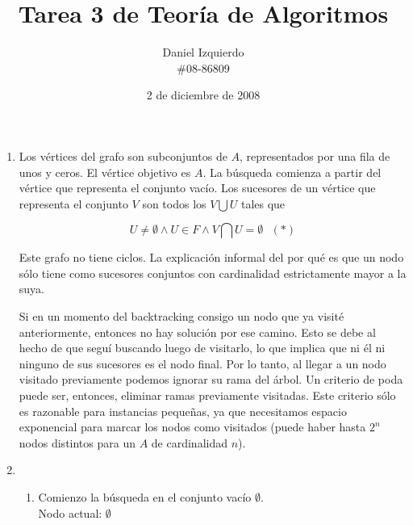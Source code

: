 \documentclass{article}
\begin{document}

\title{Tarea 3 de Teoría de Algoritmos}
\author{Daniel Izquierdo \\ \#08-86809}
\date{2 de diciembre de 2008}

\maketitle

\renewcommand{\labelenumi}{\alph{enumi})}

\section{}

\begin{enumerate}

 \item

Los vértices del grafo son subconjuntos de $A$, representados por una fila
de unos y ceros. El vértice objetivo es $A$. La búsqueda comienza a partir del vértice
que representa el conjunto vacío. Los sucesores de un vértice que representa el conjunto
$V$ son todos los $V \bigcup U$ tales que

$$
U \neq \emptyset \wedge U \in F \wedge V \bigcap U = \emptyset \text{ }(*)
$$

Este grafo no tiene ciclos. La explicación informal del por qué es que un nodo sólo tiene
como sucesores conjuntos con cardinalidad estrictamente mayor a la suya.

Si en un momento del backtracking consigo un nodo que ya visité anteriormente, entonces no hay solución
por ese camino. Esto se debe al hecho de que seguí buscando luego de visitarlo, lo que implica que ni él ni
ninguno de sus sucesores es el nodo final. Por lo tanto, al llegar a un nodo visitado previamente podemos
ignorar su rama del árbol. Un criterio de poda puede ser, entonces, eliminar ramas previamente visitadas.
Este criterio sólo es razonable para instancias pequeñas, ya que necesitamos espacio exponencial para marcar
los nodos como visitados (puede haber hasta $2^n$ nodos distintos para un $A$ de cardinalidad $n$).

 \item

\renewcommand{\labelenumii}{\arabic{enumii}.}

\begin{enumerate}
\item Comienzo la búsqueda en el conjunto vacío $\emptyset$. \\
      Nodo actual: $\emptyset$


\end{enumerate}
\end{enumerate}
\end{document}
